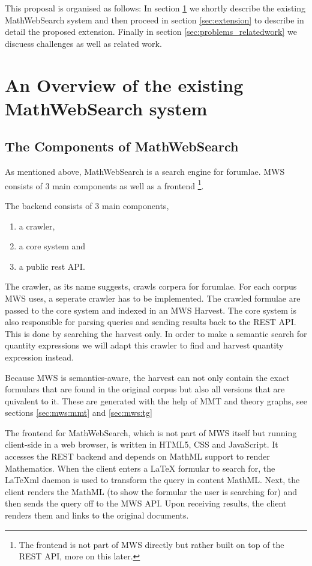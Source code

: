 \documentclass[11pt]{article}
\begin{document}
This proposal is organised as follows: In section \ref{sec:mws} we shortly describe the existing MathWebSearch system and then proceed in section \ref{sec:extension} to describe in detail the proposed extension. Finally in section \ref{sec:problems_relatedwork} we discuess challenges as well as related work.

\section{An Overview of the existing MathWebSearch system}
\label{sec:mws}

\subsection{The Components of MathWebSearch}

As mentioned above, MathWebSearch is a search engine for forumlae. MWS consists of 3 main components as well as a frontend \footnote{The frontend is not part of MWS directly but rather built on top of the REST API, more on this later. }\cite{KohPro:MWSmanual}.

The backend consists of 3 main components,
\begin{enumerate}
  \item a crawler,
  \item a core system and
  \item a public rest API.
\end{enumerate}

The crawler, as its name suggests, crawls corpera for forumlae. For each corpus MWS uses, a seperate crawler has to be implemented. The crawled formulae are passed to the core system and indexed in an MWS Harvest. The core system is also responsible for parsing queries and sending results back to the REST API. This is done by searching the harvest only. In order to make a semantic search for quantity expressions we will adapt this crawler to find and harvest quantity expression instead.

Because MWS is semantics-aware, the harvest can not only contain the exact formulars that are found in the original corpus but also all versions that are quivalent to it. These are generated with the help of MMT and theory graphs, see sections \ref{sec:mws:mmt} and \ref{sec:mws:tg}

The frontend for MathWebSearch, which is not part of MWS itself but running client-side in a web browser, is written in HTML5, CSS and JavaScript. It accesses the REST backend and depends on MathML support to render Mathematics. When the client enters a \LaTeX{} formular to search for, the \LaTeX{}ml daemon \cite{latexml-daemon} is used to transform the query in content MathML. Next, the client renders the MathML (to show the formular the user is searching for) and then sends the query off to the MWS API. Upon receiving results, the client renders them and links to the original documents.
\end{document}
